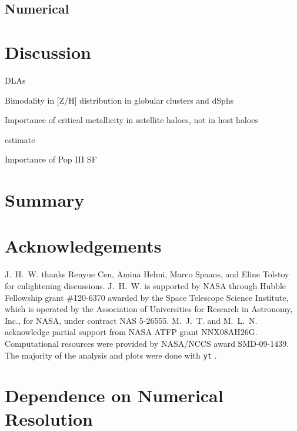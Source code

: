 \documentclass[useAMS,usenatbib]{mn2e}
\begin{document}
\subsection{Numerical}

\section{Discussion}
\label{sec:discuss}

\li DLAs

\li Bimodality in [Z/H] distribution in globular clusters and dSphs

\li Importance of critical metallicity in satellite haloes, not in host
haloes

\li [$\alpha$/Fe] estimate

\li Importance of Pop III SF

\section{Summary}
\label{sec:summary}

\section*{Acknowledgements}

J.~H.~W. thanks Renyue Cen, Amina Helmi, Marco Spaans, and Eline
Tolstoy for enlightening discussions.  J.~H.~W. is supported by NASA
through Hubble Fellowship grant \#120-6370 awarded by the Space
Telescope Science Institute, which is operated by the Association of
Universities for Research in Astronomy, Inc., for NASA, under contract
NAS 5-26555.  M.~J.~T. and M.~L.~N. acknowledge partial support from
NASA ATFP grant NNX08AH26G.  Computational resources were provided by
NASA/NCCS award SMD-09-1439.  The majority of the analysis and plots
were done with \texttt{yt} \citep{yt_full_paper}.


\bsp
\label{lastpage}

\appendix

\section[]{Dependence on Numerical Resolution}
\end{document}
